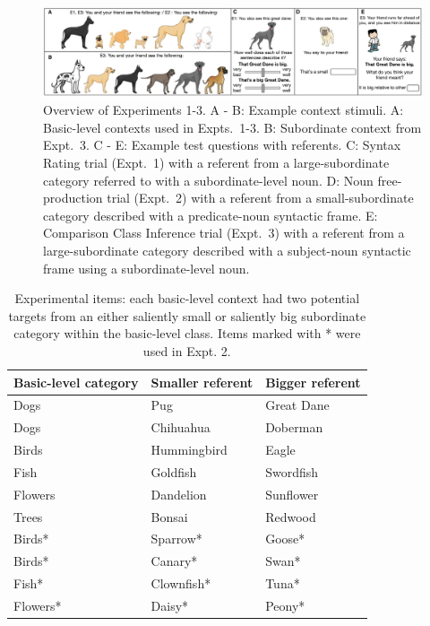 \documentclass[a4paper,man,natbib]{apa6}
\begin{document}
\begin{figure}[t]
\begin{center}
\includegraphics[width=\textwidth]{screenshots.pdf}
\end{center}
\caption{Overview of Experiments 1-3. A - B: Example context stimuli. A: Basic-level contexts used in Expts.~1-3. B: Subordinate context from Expt.~3. C - E: Example test questions with referents. C: Syntax Rating trial (Expt.~1) with a referent from a large-subordinate category referred to with a subordinate-level noun. D: Noun free-production trial (Expt.~2) with a referent from a small-subordinate category described with a predicate-noun syntactic frame. E: Comparison Class Inference trial (Expt.~3) with a referent from a large-subordinate category described with a subject-noun syntactic frame using a subordinate-level noun.} 
\label{screenshots}
\end{figure}
\begin{table}[t]
\small{
\begin{center}
\caption{Experimental items: each basic-level context had two potential targets from an either saliently small or saliently big subordinate category within the basic-level class. Items marked with * were used in Expt. 2.}
\label{tab:stimuli}
\vskip 0.12in
\fontsize{10}{11}\selectfont
\begin{tabularx}{\linewidth}{lll}
\hline
 Basic-level category & Smaller referent & Bigger referent\\
\hline
 Dogs & Pug & Great Dane \\
 Dogs & Chihuahua & Doberman\\
 Birds & Hummingbird & Eagle  \\
 Fish & Goldfish & Swordfish \\
 Flowers & Dandelion & Sunflower\\
 Trees & Bonsai & Redwood\\
Birds* & Sparrow* & Goose* \\
Birds* & Canary* & Swan* \\
Fish* & Clownfish* & Tuna* \\
Flowers* & Daisy* & Peony* \\
\hline     
\end{tabularx}
\end{center}
}
\end{table}
\end{document}
